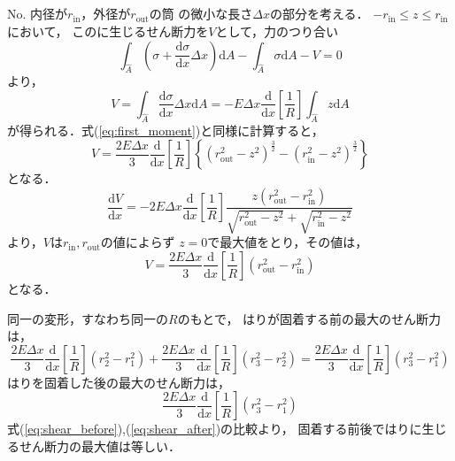 \documentclass[a4paper]{jsarticle}
\begin{document}
\subsection{}
No.
内径が$r_{\mathrm{in}}$，外径が$r_{\mathrm{out}}$の筒
の微小な長さ$\Delta x$の部分を考える．
$-r_{\mathrm{in}} \leq z \leq r_{\mathrm{in}}$において，
このに生じるせん断力を$V$として，力のつり合い
\begin{equation}
  \int_{\hat{A}} \left(
  \sigma + \frac{\mathrm{d} \sigma}{\mathrm{d} x} \Delta x
  \right) \mathrm{d} A -
  \int_{\hat{A}} \sigma \mathrm{d} A
  - V = 0
\end{equation}
より，
\begin{equation}
  V  = \int_{\hat{A}} \frac{\mathrm{d} \sigma}{\mathrm{d} x}
  \Delta x \mathrm{d} A
  = -E \Delta x \frac{\mathrm{d}}{\mathrm{d} x}
  \left[\frac{1}{R}\right] \int_{\hat{A}} z \mathrm{d} A
\end{equation}
が得られる．式(\ref{eq:first_moment})と同様に計算すると，
\begin{equation}
  V = \frac{2 E \Delta x}{3} \frac{\mathrm{d}}{\mathrm{d} x}
  \left[\frac{1}{R}\right]
  \left\{(r_{\mathrm{out}}^2 - z^2)^{\frac{3}{2}}
  - (r_{\mathrm{in}}^2 - z^2)^{\frac{3}{2}}\right\}
\end{equation}
となる．
\begin{equation}
  \frac{\mathrm{d} V}{\mathrm{d} x} =
  -2 E \Delta x \frac{\mathrm{d}}{\mathrm{d} x}
  \left[\frac{1}{R}\right]
  \frac{z (r_{\mathrm{out}}^2 - r_{\mathrm{in}}^2)}
  {\sqrt{r_{\mathrm{out}}^2 - z^2} + \sqrt{r_{\mathrm{in}}^2 - z^2}}
\end{equation}
より，$V$は$r_{\mathrm{in}}, r_{\mathrm{out}}$の値によらず
$z = 0$で最大値をとり，その値は，
\begin{equation}
  V = \frac{2 E \Delta x}{3} \frac{\mathrm{d}}{\mathrm{d} x}
  \left[\frac{1}{R}\right] (r_{\mathrm{out}}^2 - r_{\mathrm{in}}^2)
\end{equation}
となる．\par
同一の変形，すなわち同一の$R$のもとで，
はりが固着する前の最大のせん断力は，
\begin{equation}
  \label{eq:shear_before}
  \frac{2 E \Delta x}{3} \frac{\mathrm{d}}{\mathrm{d} x}
  \left[\frac{1}{R}\right] (r_{2}^2 - r_{1}^2) +
  \frac{2 E \Delta x}{3} \frac{\mathrm{d}}{\mathrm{d} x}
  \left[\frac{1}{R}\right] (r_{3}^2 - r_{2}^2) =
  \frac{2 E \Delta x}{3} \frac{\mathrm{d}}{\mathrm{d} x}
  \left[\frac{1}{R}\right] (r_{3}^2 - r_{1}^2)
\end{equation}
はりを固着した後の最大のせん断力は，
\begin{equation}
  \label{eq:shear_after}
  \frac{2 E \Delta x}{3} \frac{\mathrm{d}}{\mathrm{d} x}
  \left[\frac{1}{R}\right] (r_{3}^2 - r_{1}^2)
\end{equation}
式(\ref{eq:shear_before}),(\ref{eq:shear_after})の比較より，
固着する前後ではりに生じるせん断力の最大値は等しい．
\end{document}

